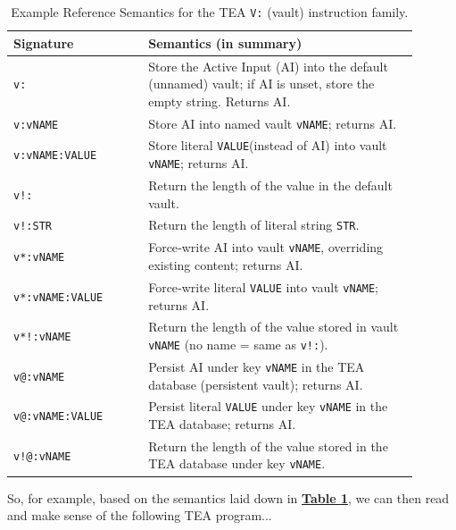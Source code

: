 \documentclass[acmtoplas]{acmart}
\begin{document}
\begin{table}[ht]
  \centering
  \small
  \caption{Example Reference Semantics for the TEA \texttt{V:} (vault) instruction family.}
  \label{tab:tea-v-semantics}
  \begin{tabular}{@{}p{0.3\linewidth} p{0.6\linewidth}@{}}
    \toprule
    \textbf{Signature} & \textbf{Semantics (in summary)} \\
    \midrule
    \texttt{v:} & Store the Active Input (AI) into the default (unnamed) vault; if AI is unset, store the empty string. Returns AI. \\
    \hline
    \texttt{v:vNAME} & Store AI into named vault \texttt{vNAME}; returns AI. \\
     \hline
    \texttt{v:vNAME:VALUE} & Store literal \texttt{VALUE}(instead of AI) into vault \texttt{vNAME}; returns AI. \\
     \hline
    \texttt{v!:} & Return the length of the value in the default vault. \\
     \hline
    \texttt{v!:STR} & Return the length of literal string \texttt{STR}. \\
     \hline
    \texttt{v*:vNAME} & Force‑write AI into vault \texttt{vNAME}, overriding existing content; returns AI. \\
     \hline
    \texttt{v*:vNAME:VALUE} & Force‑write literal \texttt{VALUE} into vault \texttt{vNAME}; returns AI. \\
     \hline
    \texttt{v*!:vNAME} & Return the length of the value stored in vault \texttt{vNAME} (no name = same as \texttt{v!:}). \\
     \hline
    \texttt{v@:vNAME} & Persist AI under key \texttt{vNAME} in the TEA database (persistent vault); returns AI. \\
     \hline
    \texttt{v@:vNAME:VALUE} & Persist literal \texttt{VALUE} under key \texttt{vNAME} in the TEA database; returns AI. \\
     \hline
    \texttt{v!@:vNAME} & Return the length of the value stored in the TEA database under key \texttt{vNAME}. \\
    \bottomrule
  \end{tabular}
\end{table}

 So, for example, based on the semantics laid down in \textbf{\hyperref[tab:tea-v-semantics]{Table \ref{tab:tea-v-semantics}}}, we can then read and make sense of the following TEA program...
 
\newpage
\end{document}
